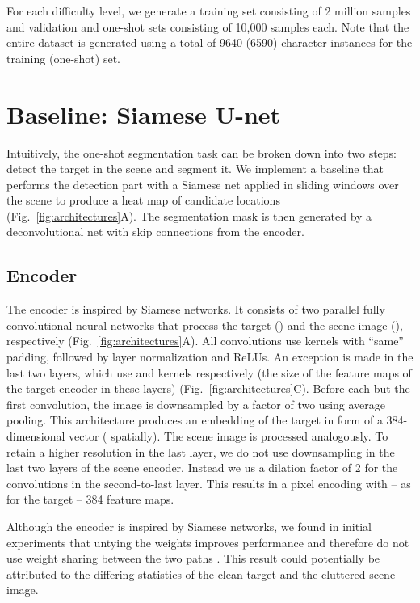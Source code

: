 \documentclass{article}
\begin{document}
For each difficulty level, we generate a training set consisting of 2 million samples and validation and one-shot sets consisting of 10,000 samples each. Note that the entire dataset is generated using a total of 9640 (6590) character instances for the training (one-shot) set.



\section{Baseline: Siamese U-net}
\label{sec:baseline}

Intuitively, the one-shot segmentation task can be broken down into two steps: detect the target in the scene and segment it. 
We implement a baseline that performs the detection part with a Siamese net applied in sliding windows over the scene to produce a heat map of candidate locations (Fig.~\ref{fig:architectures}A).
The segmentation mask is then generated by a deconvolutional net with skip connections from the encoder.


\subsection{Encoder}
\label{sec:baseline/encoder}

The encoder is inspired by Siamese networks.
It consists of two parallel fully convolutional neural networks that process the target () and the scene image (), respectively (Fig.~\ref{fig:architectures}A).
All convolutions use  kernels with ``same'' padding, followed by layer normalization \cite{Ba2016b} and ReLUs.
An exception is made in the last two layers, which use  and  kernels respectively (the size of the feature maps of the target encoder in these layers) (Fig.~\ref{fig:architectures}C).
Before each but the first convolution, the image is downsampled by a factor of two using average pooling.
This architecture produces an embedding of the target in form of a 384-dimensional vector ( spatially).
The scene image is processed analogously.
To retain a higher resolution in the last layer, we do not use downsampling in the last two layers of the scene encoder. 
Instead we us a dilation factor of 2 for the convolutions in the second-to-last layer.
This results in a  pixel encoding with -- as for the target -- 384 feature maps.

Although the encoder is inspired by Siamese networks, we found in initial experiments that untying the weights improves performance and therefore do not use weight sharing between the two paths \citep[see also][]{Bertinetto2016}.
This result could potentially be attributed to the differing statistics of the clean target and the cluttered scene image.
\end{document}
